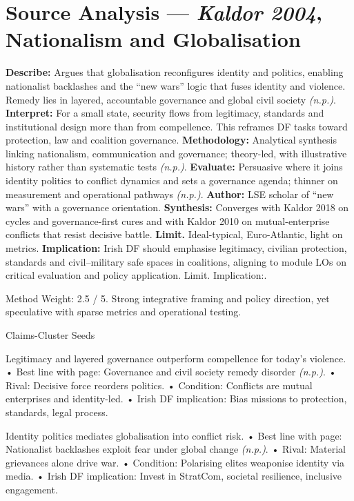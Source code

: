 \section*{Source Analysis — \textit{Kaldor 2004}, Nationalism and Globalisation}
\textbf{Describe:} Argues that globalisation reconfigures identity and politics, enabling nationalist backlashes and the “new wars” logic that fuses identity and violence. Remedy lies in layered, accountable governance and global civil society \emph{(n.p.)}.
\textbf{Interpret:} For a small state, security flows from legitimacy, standards and institutional design more than from compellence. This reframes DF tasks toward protection, law and coalition governance.
\textbf{Methodology:} Analytical synthesis linking nationalism, communication and governance; theory-led, with illustrative history rather than systematic tests \emph{(n.p.)}.
\textbf{Evaluate:} Persuasive where it joins identity politics to conflict dynamics and sets a governance agenda; thinner on measurement and operational pathways \emph{(n.p.)}.
\textbf{Author:} LSE scholar of “new wars” with a governance orientation.
\textbf{Synthesis:} Converges with Kaldor 2018 on cycles and governance-first cures and with Kaldor 2010 on mutual-enterprise conflicts that resist decisive battle.
\textbf{Limit.} Ideal-typical, Euro-Atlantic, light on metrics. \textbf{Implication:} Irish DF should emphasise legitimacy, civilian protection, standards and civil–military safe spaces in coalitions, aligning to module LOs on critical evaluation and policy application. Limit. Implication:.

Method Weight: 2.5 / 5. Strong integrative framing and policy direction, yet speculative with sparse metrics and operational testing.

Claims-Cluster Seeds

Legitimacy and layered governance outperform compellence for today’s violence.
• Best line with page: Governance and civil society remedy disorder \emph{(n.p.)}.
• Rival: Decisive force reorders politics.
• Condition: Conflicts are mutual enterprises and identity-led.
• Irish DF implication: Bias missions to protection, standards, legal process.

Identity politics mediates globalisation into conflict risk.
• Best line with page: Nationalist backlashes exploit fear under global change \emph{(n.p.)}.
• Rival: Material grievances alone drive war.
• Condition: Polarising elites weaponise identity via media.
• Irish DF implication: Invest in StratCom, societal resilience, inclusive engagement.

